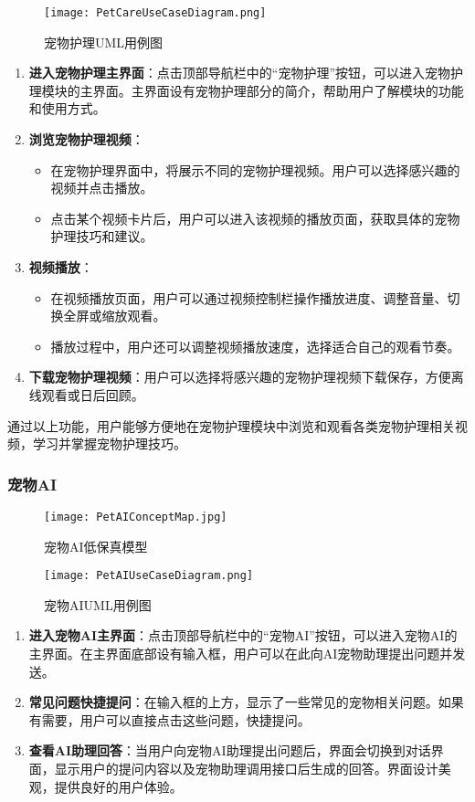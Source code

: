 \begin{figure}[H]
	\centering
	\texttt{[image: PetCareUseCaseDiagram.png]}
	\caption{宠物护理UML用例图}
	\label{PetCareUseCaseDiagram}
\end{figure}

\begin{enumerate}
	\item \textbf{进入宠物护理主界面}：点击顶部导航栏中的“宠物护理”按钮，可以进入宠物护理模块的主界面。主界面设有宠物护理部分的简介，帮助用户了解模块的功能和使用方式。
	\item \textbf{浏览宠物护理视频}：
	\begin{itemize}
		\item 在宠物护理界面中，将展示不同的宠物护理视频。用户可以选择感兴趣的视频并点击播放。
		\item 点击某个视频卡片后，用户可以进入该视频的播放页面，获取具体的宠物护理技巧和建议。
	\end{itemize}
	\item \textbf{视频播放}：
	\begin{itemize}
		\item 在视频播放页面，用户可以通过视频控制栏操作播放进度、调整音量、切换全屏或缩放观看。
		\item 播放过程中，用户还可以调整视频播放速度，选择适合自己的观看节奏。
	\end{itemize}
	\item \textbf{下载宠物护理视频}：用户可以选择将感兴趣的宠物护理视频下载保存，方便离线观看或日后回顾。
\end{enumerate}

通过以上功能，用户能够方便地在宠物护理模块中浏览和观看各类宠物护理相关视频，学习并掌握宠物护理技巧。

\subsubsection{宠物AI}

\begin{figure}[H]
	\centering
	\texttt{[image: PetAIConceptMap.jpg]}
	\caption{宠物AI低保真模型}
	\label{PetAIConceptMap}
\end{figure}

\begin{figure}[H]
	\centering
	\texttt{[image: PetAIUseCaseDiagram.png]}
	\caption{宠物AIUML用例图}
	\label{UserInterfaceConceptMap}
\end{figure}

\begin{enumerate}
	\item \textbf{进入宠物AI主界面}：点击顶部导航栏中的“宠物AI”按钮，可以进入宠物AI的主界面。在主界面底部设有输入框，用户可以在此向AI宠物助理提出问题并发送。
	\item \textbf{常见问题快捷提问}：在输入框的上方，显示了一些常见的宠物相关问题。如果有需要，用户可以直接点击这些问题，快捷提问。
	\item \textbf{查看AI助理回答}：当用户向宠物AI助理提出问题后，界面会切换到对话界面，显示用户的提问内容以及宠物助理调用接口后生成的回答。界面设计美观，提供良好的用户体验。
\end{enumerate}

